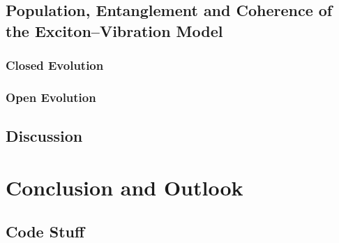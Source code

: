 \documentclass[12pt]{article}
\begin{document}
\subsection{Population, Entanglement and Coherence of the Exciton--Vibration Model}
\subsubsection{Closed Evolution}
\subsubsection{Open Evolution}
\subsection{Discussion}




































\newpage
\section{Conclusion and Outlook}











































\begin{appendices}
    \section{Code Stuff} \label{appendix_code}
\end{appendices}
\newpage

 
 
\end{document}
